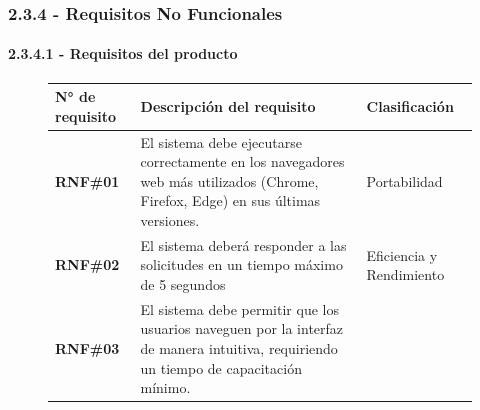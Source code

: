 \subsubsection{2.3.4 - Requisitos No Funcionales}

\paragraph{2.3.4.1 - Requisitos del producto}

\begin{figure}[H]
    \centering
    \begin{tabularx}{\textwidth}{|l|X|l|}
    \hline

            \textbf{N° de requisito} 
        
        & 


        
            \textbf{Descripción del requisito} 
        
        & 


        
            \textbf{Clasificación} 
        
    \\ \hline
    
            \textbf{RNF\#01} 
        
        & 
        
            El sistema debe ejecutarse correctamente en los navegadores web más utilizados (Chrome, Firefox, Edge) en sus últimas versiones. 
        
        & 
        
            Portabilidad 
        
    \\ \hline
    
            \textbf{RNF\#02} 
        
        & 
        
            El sistema deberá responder a las solicitudes en un tiempo máximo de 5 segundos 
        
        & 
        
            Eficiencia y Rendimiento 
        
    \\ \hline
    
            \textbf{RNF\#03} 
        
        & 
        
            El sistema debe permitir que los usuarios naveguen por la interfaz de manera intuitiva, requiriendo un tiempo de capacitación mínimo. 
        

\end{tabularx}
\end{figure}
